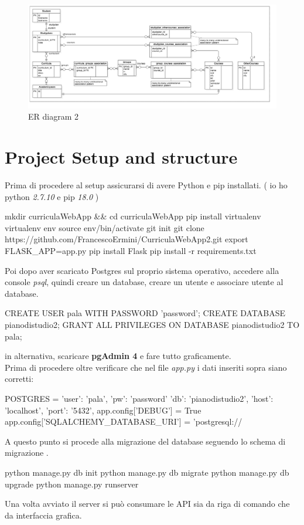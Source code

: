 \documentclass{article}
\begin{document}
\begin{figure}[H]
  \begin{center}
   \includegraphics[width=\textwidth]{img/ERD.png}
     \caption{ER diagram 2}
  \label{fig: Entity Relationship diagram 2}
  \end{center}
\end{figure}



\section{Project Setup and structure}
Prima di procedere al setup assicurarsi di avere Python e pip installati. ( io ho python \textit{2.7.10} e pip \textit{18.0} ) 
\begin{shell}[caption=Setup Flask]
mkdir curriculaWebApp && cd curriculaWebApp
pip install virtualenv
virtualenv env
source env/bin/activate
git init
git clone https://github.com/FrancescoErmini/CurriculaWebApp2.git
export FLASK_APP=app.py
pip install Flask
pip install -r requirements.txt
\end{shell}
Poi dopo aver scaricato Postgres sul  proprio sistema operativo, accedere alla console \emph{psql}, quindi creare un database, creare un utente e associare utente al database.
\begin{shell}[caption=Create database]
CREATE USER pala WITH PASSWORD 'password';
CREATE DATABASE pianodistudio2;
GRANT ALL PRIVILEGES ON DATABASE pianodistudio2 TO pala;
\end{shell}
in alternativa, scaricare \textbf{pgAdmin 4} e fare tutto graficamente.\\
Prima di procedere oltre verificare che nel file \emph{app.py} i dati inseriti sopra siano corretti:
\begin{python}[firstnumber=16, caption=Flask db configuration]
POSTGRES = {
    'user': 'pala',
    'pw': 'password'
    'db': 'pianodistudio2',
    'host': 'localhost',
    'port': '5432',
}
app.config['DEBUG'] = True
app.config['SQLALCHEMY_DATABASE_URI'] = 'postgresql://%
\end{python}
A questo punto si procede alla migrazione del database seguendo lo schema di migrazione \cite{ref1}. 
\begin{shell}[caption=Initialize database]
python manage.py db init
python manage.py db migrate
python manage.py db upgrade
python manage.py runserver
\end{shell}
Una volta avviato il server si può consumare le API sia da riga di comando che da interfaccia grafica.
\end{document}
